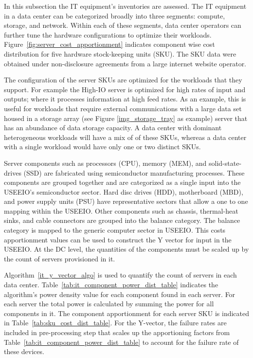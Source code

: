         In this subsection the IT equipment's inventories are assessed. The IT equipment in a data center can be categorized broadly into three segments: compute, storage, and network. Within each of these segments, data center operators can further tune the hardware configurations to optimize their workloads. Figure~\ref{fig:server_cost_apportionment} indicates component wise cost distribution for five hardware stock-keeping units (SKU). The SKU data were obtained under non-disclosure agreements from a large internet website operator.  
        
        
        
        The configuration of the server SKUs are optimized for the workloads that they support. For example the High-IO server is optimized for high rates of input and outputs; where it processes information at high feed rates. As an example, this is useful for workloads that require external communications with a large data set housed in a storage array (see Figure \ref{img_storage_tray} as example) server that has an abundance of data storage capacity. A data center with dominant heterogeneous workloads will have a mix of of these SKUs, whereas a data center with a single workload would have only one or two distinct SKUs.
        
        Server components such as processors (CPU), memory (MEM), and solid-state-drives (SSD) are fabricated using semiconductor manufacturing processes. These components are grouped together and are categorized as a single input into the USEEIO’s semiconductor sector. Hard disc drives (HDD), motherboard (MBD), and power supply units (PSU) have representative sectors that allow a one to one mapping within the USEEIO. Other components such as chassis, thermal-heat sinks, and cable connectors are grouped into the balance category. The balance category is mapped to the generic computer sector in USEEIO. This costs apportionment values can be used to construct the Y vector for input in the USEEIO. At the DC level, the quantities of the components must be scaled up by the count of servers provisioned in it.
        
         Algorithm~\ref{it_y_vector_algo} is used to quantify the count of servers in each data center. Table~\ref{tab:it_component_power_dist_table} indicates the algorithm's power density value for each component found in each server. For each server the total power is calculated by summing the power for all components in it. The component apportionment for each server SKU is indicated in Table~\ref{tab:sku_cost_dist_table}. For the Y-vector, the failure rates are included in pre-processing step that scales up the apportioning factors from Table~\ref{tab:it_component_power_dist_table} to account for the failure rate of these devices. 
         
